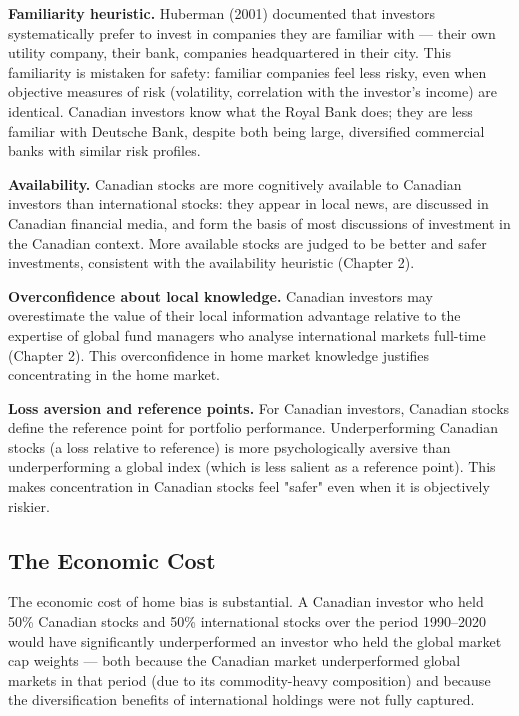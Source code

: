 \documentclass[12pt, letterpaper]{article}
\begin{document}
\textbf{Familiarity heuristic.} Huberman (2001) documented that investors systematically prefer to invest in companies they are familiar with --- their own utility company, their bank, companies headquartered in their city. This familiarity is mistaken for safety: familiar companies feel less risky, even when objective measures of risk (volatility, correlation with the investor's income) are identical. Canadian investors know what the Royal Bank does; they are less familiar with Deutsche Bank, despite both being large, diversified commercial banks with similar risk profiles.

\textbf{Availability.} Canadian stocks are more cognitively available to Canadian investors than international stocks: they appear in local news, are discussed in Canadian financial media, and form the basis of most discussions of investment in the Canadian context. More available stocks are judged to be better and safer investments, consistent with the availability heuristic (Chapter 2).

\textbf{Overconfidence about local knowledge.} Canadian investors may overestimate the value of their local information advantage relative to the expertise of global fund managers who analyse international markets full-time (Chapter 2). This overconfidence in home market knowledge justifies concentrating in the home market.

\textbf{Loss aversion and reference points.} For Canadian investors, Canadian stocks define the reference point for portfolio performance. Underperforming Canadian stocks (a loss relative to reference) is more psychologically aversive than underperforming a global index (which is less salient as a reference point). This makes concentration in Canadian stocks feel "safer" even when it is objectively riskier.


\subsection{The Economic Cost}


The economic cost of home bias is substantial. A Canadian investor who held 50\% Canadian stocks and 50\% international stocks over the period 1990--2020 would have significantly underperformed an investor who held the global market cap weights --- both because the Canadian market underperformed global markets in that period (due to its commodity-heavy composition) and because the diversification benefits of international holdings were not fully captured.
\end{document}
